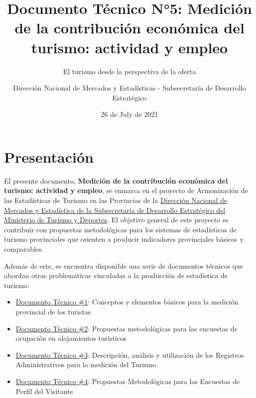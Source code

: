 \documentclass[
  openany]{book}
\title{Documento Técnico N°5: Medición de la contribución económica del turismo: actividad y empleo}
\subtitle{El turismo desde la perspectiva de la oferta}
\author{Dirección Nacional de Mercados y Estadísticas - Subsecretaría de Desarrollo Estratégico}
\date{26 de July de 2021}
\let\oldmaketitle\maketitle
\begin{document}
\maketitle


\newpage

\let\maketitle\oldmaketitle
\maketitle

{
\setcounter{tocdepth}{1}
\tableofcontents
}
\hypertarget{presentaciuxf3n}{%
\chapter*{Presentación}\label{presentaciuxf3n}}

El presente documento, \textbf{Medición de la contribución económica del turismo: actividad y empleo}, se enmarca en el proyecto de Armonización de las Estadísticas de Turismo en las Provincias de la \href{http://datos.yvera.gob.ar/}{Dirección Nacional de Mercados y Estadística de la Subsecretaría de Desarrollo Estratégico del Ministerio de Turismo y Deportes}. El objetivo general de este proyecto es contribuir con propuestas metodológicas para los sistemas de estadísticas de turismo provinciales que orienten a producir indicadores provinciales básicos y comparables.

Además de este, se encuentra disponible una serie de documentos técnicos que abordan otras problemáticas vinculadas a la producción de estadística de turismo:

\begin{itemize}
\item
  \href{https://dnme-minturdep.github.io/DT1_medicion_turismo/}{Documento Técnico \#1}: Conceptos y elementos básicos para la medición provincial de los turistas
\item
  \href{https://dnme-minturdep.github.io/DT2_encuestas/}{Documento Técnico \#2}: Propuestas metodológicas para las encuestas de ocupación en alojamientos turísticos
\item
  \href{https://dnme-minturdep.github.io/DT3_registros_adminsitrativos/}{Documento Técnico \#3}: Descripción, análisis y utilización de los Registros Administrativos para la medición del Turismo
\item
  \href{https://dnme-minturdep.github.io/DT4_perfiles/}{Documento Técnico \#4}: Propuestas Metodológicas para las Encuestas de Perfil del Visitante
\end{itemize}
\end{document}
